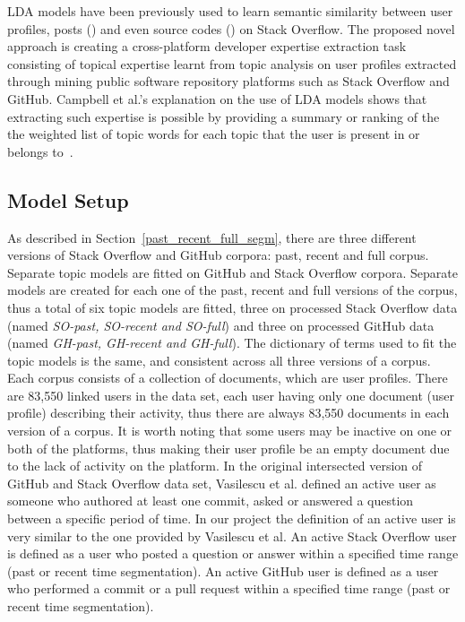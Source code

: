     LDA models have been previously used to learn semantic similarity between user profiles, posts (\cite{tian2013predicting}) and even source codes (\cite{arwan2015source}) on Stack Overflow. The proposed novel approach is creating a cross-platform developer expertise extraction task consisting of topical expertise learnt from topic analysis on user profiles extracted through mining public software repository platforms such as Stack Overflow and GitHub. Campbell et al.'s explanation on the use of LDA models shows that extracting such expertise is possible by providing a summary or ranking of the the weighted list of topic words for each topic that the user is present in or belongs to~\cite{campbell2015latent}. 
        
    \subsection{Model Setup} \label{activeUser_Def}
    
        As described in Section~\ref{past_recent_full_segm}, there are three different versions of Stack Overflow and GitHub corpora: past, recent and full corpus. Separate topic models are fitted on GitHub and Stack Overflow corpora. Separate models are created for each one of the past, recent and full versions of the corpus, thus a total of six topic models are fitted, three on processed Stack Overflow data (named \emph{SO-past, SO-recent and SO-full}) and three on processed GitHub data (named \emph{GH-past, GH-recent and GH-full}). The dictionary of terms used to fit the topic models is the same, and consistent across all three versions of a corpus. Each corpus consists of a collection of documents, which are user profiles. There are 83,550 linked users in the data set, each user having only one document (user profile) describing their activity, thus there are always 83,550 documents in each version of a corpus. It is worth noting that some users may be inactive on one or both of the platforms, thus making their user profile be an empty document due to the lack of activity on the platform. In the original intersected version of GitHub and Stack Overflow data set, Vasilescu et al. \cite{vasilescu2013stackoverflow} defined an active user as someone who authored at least one commit, asked or answered a question between a specific period of time. In our project the definition of an active user is very similar to the one provided by Vasilescu et al. An active Stack Overflow user is defined as a user who posted a question or answer within a specified time range (past or recent time segmentation). An active GitHub user is defined as a user who performed a commit or a pull request within a specified time range (past or recent time segmentation).
    
